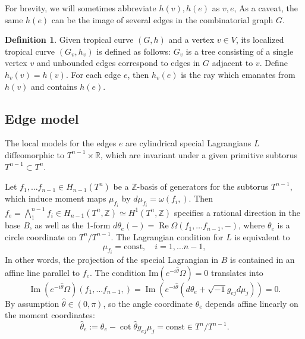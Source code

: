 \documentclass{article}
\theoremstyle{definition}
\newtheorem{Def}[thm]{Definition}
\newcommand{\R}{\mathbb{R}}
\newcommand{\Z}{\mathbb{Z}}
\begin{document}
	
	For brevity, we will sometimes abbreviate $h(v), h(e)$ as $v, e$, As a caveat, the same $h(e)$ can be the image of several edges in the combinatorial graph $G$.
	
	
	
	
	\begin{Def}  Given tropical curve $(G,h)$ and a vertex $v\in V$, its localized tropical curve $(G_v,h_v)$ is defined as follows: $G_v$ is a tree consisting of a single vertex $v$ and unbounded edges correspond to edges in $G$ adjacent to $v$. Define $h_v(v)=h(v)$. For each edge $e$, then $h_v(e)$ is the ray which emanates from $h(v)$ and contains $h(e)$.
		
		
	\end{Def}
	
	
	
	
	
	
	\subsection{Edge model}\label{sec: edge}
	
	
	The local models for the edges $e$ are cylindrical special Lagrangians $L$ diffeomorphic to $T^{n-1}\times \R$, which are invariant under a given primitive subtorus $T^{n-1}\subset T^n$. 
	
	
	
	Let $f_1,\ldots f_{n-1}\in H_{n-1}(T^n)$ be a $\Z$-basis of generators for the subtorus $T^{n-1}$, which induce moment maps $\mu_{f_i}$ by $d \mu_{f_i}=\omega(f_i, )$. Then $f_e=\bigwedge_1^{n-1} f_i \in H_{n-1}(T^n,\mathbb{Z})\simeq H^1(T^n,\mathbb{Z})$ specifies a rational direction in the base $B$, as well as the 1-form $d\theta_e(-)= \operatorname{Re}\Omega(f_1,\ldots f_{n-1},-)$, where $\theta_e$ is a circle coordinate on $T^n/T^{n-1}$. The Lagrangian condition for $L$ is equivalent to
	\[
	\mu_{f_i}= \text{const}, \quad i=1,\ldots n-1,
	\] 
	In other words, the projection of the special Lagrangian in $B$ is contained in an affine line parallel to $f_e$. The condition $\text{Im}(e^{-i\hat{\theta}}\Omega)=0$ translates into
	\[
	\operatorname{Im} (  e^{-i\hat{\theta}}\Omega) (f_1,\ldots f_{n-1}, )=  \operatorname{Im} (  e^{-i\hat{\theta}} ( d\theta_e+ \sqrt{-1} g_{ej} d\mu_j ))=0. 
	\]
	By assumption $\hat{\theta}\in (0,\pi)$, so the angle coordinate $\theta_e$ depends affine linearly on the moment coordinates:
	\begin{equation}\label{phaseonedge}
		\hat{\theta}_e:=  \theta_e- \cot \hat{\theta} g_{ej}\mu_j= \text{const} \in  T^n/T^{n-1}.
	\end{equation}
	
\end{document}
